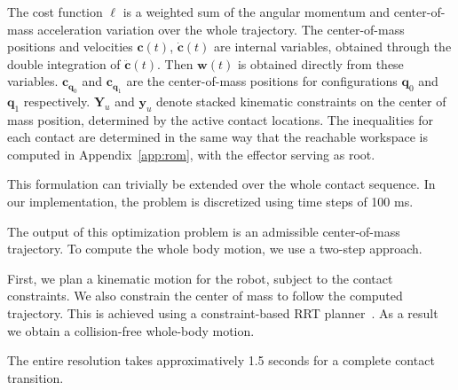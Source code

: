 \documentclass[journal]{IEEEtran}
\newcommand{\commentt}[2]{\textcolor{#1}{\textbf{\textit{[#2]}}}} 	%
\newcommand{\adnote}[1]{\commentt{blue}{AD: #1}}
\providecommand{\DIFaddtex}[1]{#1} %
\providecommand{\DIFdeltex}[1]{} %
\providecommand{\DIFaddbegin}{\protect\color{blue}} %
\providecommand{\DIFaddend}{\protect\color{black}} %
\providecommand{\DIFdelbegin}{\protect\cbdelete} %
\providecommand{\DIFdelend}{} %
\providecommand{\DIFadd}[1]{\texorpdfstring{\DIFaddtex{#1}}{#1}} %
\providecommand{\DIFdel}[1]{\texorpdfstring{\DIFdeltex{#1}}{}} %
\begin{document}
\DIFdelend %
The cost function $\ell$ is a weighted sum of the angular momentum and center-of-mass acceleration variation over the whole trajectory.
The \DIFdelbegin \DIFdel{system dynamics $dyn$ tie together the position, velocity and acceleration of the center of mass.
}\DIFdelend \DIFaddbegin \DIFadd{center-of-mass positions and velocities $\mathbf{c}(t)$, $\mathbf{\dot{c}}(t)$ are internal variables, obtained through the double integration of $\mathbf{\ddot{c}}(t)$.
Then $\mathbf{w}(t)$ is obtained directly from these variables. $\mathbf{c}_{\mathbf{q}_0}$ and $\mathbf{c}_{\mathbf{q}_1}$ are the center-of-mass positions for configurations
 $\mathbf{q}_0$ and $\mathbf{q}_1$ respectively.
}\DIFaddend $\mathbf{Y}_u$ and $\mathbf{y}_u$ denote stacked kinematic constraints on the center of mass position, determined by the active contact locations.
The inequalities for each contact are determined in the same way that the reachable workspace is computed in Appendix~\ref{app:rom}, with
the effector serving as root. %

This formulation can trivially be extended over the whole contact sequence.
In our implementation, the problem is discretized using time steps of 100 ms. 

The output of this optimization problem is an admissible center-of-mass trajectory.
To compute the whole body motion, we use a two-step approach.

First, we plan a kinematic motion for the robot, subject to the contact constraints. We also constrain the center of mass to follow
the computed trajectory. This is achieved using a constraint-based RRT planner~\citep{7759083}. As a result we obtain a collision-free whole-body motion.

The entire resolution takes approximatively 1.5 seconds for a complete contact transition.

\DIFdelbegin \DIFdel{This motion is then validated in our dynamic simulator~\citep{DelPrete2015b}, using the trajectory as a reference postural task for an inverse-dynamics
controller that accounts for all the robot constraints. This final result is shown in the companion video.
}\section{\DIFdel{Algorithms for the discretization of a path}}
\addtocounter{section}{-1}%
\end{document}
